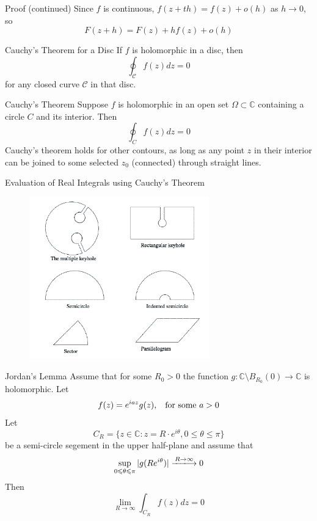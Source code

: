 \documentclass{beamer}
\begin{document}
\begin{frame}
\begin{block}{Proof (continued)}
Since $f$ is continuous, $f(z+th)=f(z)+o(h)$ as $h\rightarrow0$, so
$$F(z+h)=F(z)+hf(z)+o(h)$$
\end{block}
\end{frame}

\begin{frame}
\begin{block}{Cauchy's Theorem for a Disc}
If $f$ is holomorphic in a disc, then
$$\oint_{\mathcal{C}}f(z)dz=0$$
for any closed curve $\mathcal{C}$ in that disc.
\end{block}
\begin{block}{Cauchy's Theorem}
Suppose $f$ is holomorphic in an open set $\Omega\subset\mathbb{C}$ containing a circle $C$ and its interior. Then
$$\oint_Cf(z)dz=0$$
Cauchy's theorem holds for other contours, as long as any point $z$ in their interior can be joined to some selected $z_0$ (connected) through straight lines.
\end{block}
\end{frame}

\begin{frame}
\begin{block}{Evaluation of Real Integrals using Cauchy's Theorem}
\begin{figure}[h]
    \centering
    \includegraphics[height=7cm]{toy.png}
\end{figure}
\end{block}
\end{frame}

\begin{frame}
\begin{block}{Jordan's Lemma}
Assume that for some $R_0>0$ the function $g:\mathbb{C}\setminus B_{R_0}(0)\rightarrow\mathbb{C}$ is holomorphic. Let
$$f(z)=e^{iaz}g(z),\hspace{3mm}\text{for some }a>0$$
Let
$$C_R=\lbrace z\in\mathbb{C}:z=R\cdot e^{i\theta},0\leqslant\theta\leqslant\pi\rbrace$$
be a semi-circle segement in the upper half-plane and assume that
$$\sup_{0\leqslant\theta\leqslant\pi}|g(Re^{i\theta})|\xlongrightarrow{R\rightarrow\infty}0$$
Then
$$\lim_{R\rightarrow \infty}\int_{C_R}f(z)dz=0$$
 
\end{block}
\end{frame}
\end{document}
